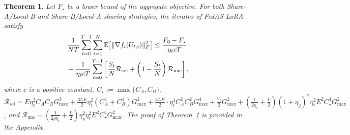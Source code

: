 \documentclass[lettersize,journal]{IEEEtran}
\newtheorem{theorem}{Theorem}
\begin{document}
\begin{theorem}
	\label{thm:arbitrary_participation}
	Let $F_\star$ be a lower bound of the aggregate objective. For both Share-A/Local-B and Share-B/Local-A sharing strategies, the iterates of FedAS-LoRA satisfy
	\begin{align}
		&\frac{1}{NT}\sum_{t=0}^{T-1}\sum_{i=1}^{N}
		\mathbb{E}\!\left[\|\nabla f_i(U_{t,i})\|_F^2\right] \le
		\frac{F_0-F_\star}{\eta_{\ell} c T}
		\notag\\
		&+
		\frac{1}{\eta_{\ell} c T}\sum_{t=0}^{T-1}\left[\frac{S_t}{N}\mathcal{R}_{\mathrm{sel}}+\left(1-\frac{S_t}{N}\right)\mathcal{R}_{\mathrm{uns}}\right],
		\label{eq:convergence_bound}
	\end{align}
	where $c$ is a positive constant, $C_\star:=\max\{C_A,C_B\}$, $\mathcal{R}_{\mathrm{sel}}\!=\!
	E\eta_{\ell}^{2}C_AC_BG_{\max}^{3}
	\!+\! \frac{3LE}{2} \eta_{\ell}^{2}(C_A^{4}\!+\!C_B^{4})G_{\max}^{2} \!+\! \frac{3LE}{2} \cdot
	\eta_{\ell}^{4}C_A^{2}C_B^{2}G_{\max}^{4}
	\!+\! \frac{\eta_{\ell}}{2}G_{\max}^{2} \!+\!
	(\frac{1}{2\eta_{\ell}} \!+\! \frac{L}{2})
	(1\!+\!\eta_g)^{2}\eta_{\ell}^{2}E^{2}
	C_\star^{4}G_{\max}^{2}$, and $\mathcal{R}_{\mathrm{uns}}=(
	\frac{1}{2\rho\eta_{\ell}}+\frac{L}{2}
	)\eta_g^{2}\eta_{\ell}^{2}E^{2}
	C_\star^{4}G_{\max}^{2}$.
	The proof of Theorem~\ref{thm:arbitrary_participation} is provided in the Appendix.
\end{theorem}
\end{document}
